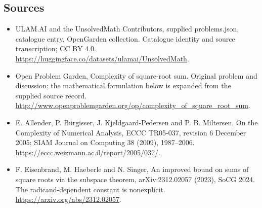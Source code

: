 \documentclass[11pt,a4paper]{article}
\begin{document}
\subsection{Sources}
\begin{itemize}
\item[S1] ULAM.AI and the UnsolvedMath Contributors, supplied problems.json, catalogue entry, OpenGarden collection. Catalogue identity and source transcription; CC BY 4.0.
\url{https://huggingface.co/datasets/ulamai/UnsolvedMath}.
\item[S2] Open Problem Garden, Complexity of square-root sum. Original problem and discussion; the mathematical formulation below is expanded from the supplied source record.
\url{http://www.openproblemgarden.org/op/complexity_of_square_root_sum}.
\item[S3] E. Allender, P. Bürgisser, J. Kjeldgaard-Pedersen and P. B. Miltersen, On the Complexity of Numerical Analysis, ECCC TR05-037, revision 6 December 2005; SIAM Journal on Computing 38 (2009), 1987--2006.
\url{https://eccc.weizmann.ac.il/report/2005/037/}.
\item[S4] F. Eisenbrand, M. Haeberle and N. Singer, An improved bound on sums of square roots via the subspace theorem, arXiv:2312.02057 (2023), SoCG 2024. The radicand-dependent constant is nonexplicit.
\url{https://arxiv.org/abs/2312.02057}.
\end{itemize}
\end{document}
